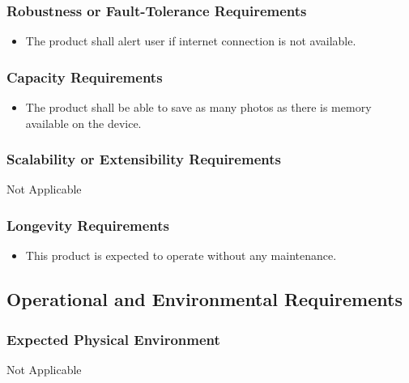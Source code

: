 \documentclass[]{article}
\begin{document}
\subsubsection{Robustness or Fault-Tolerance Requirements}
\label{ssub:robustness_or_fault_tolerance_requirements}
\begin{itemize}
	\item The product shall alert user if internet connection is not available.
\end{itemize}

\subsubsection{Capacity Requirements}
\label{ssub:capacity_requirements}
\begin{itemize}
	\item The product shall be able to save as many photos as there is memory available on the device.
\end{itemize}

\subsubsection{Scalability or Extensibility Requirements}
\label{ssub:scalability_or_extensibility_requirements}
Not Applicable

\subsubsection{Longevity Requirements}
\label{ssub:longevity_requirements}
\begin{itemize}
	\item This product is expected to operate without any maintenance.
\end{itemize}


\subsection{Operational and Environmental Requirements}
\label{sub:operational_and_environmental_requirements}

\subsubsection{Expected Physical Environment}
\label{ssub:expected_physical_environment}
Not Applicable
\end{document}
